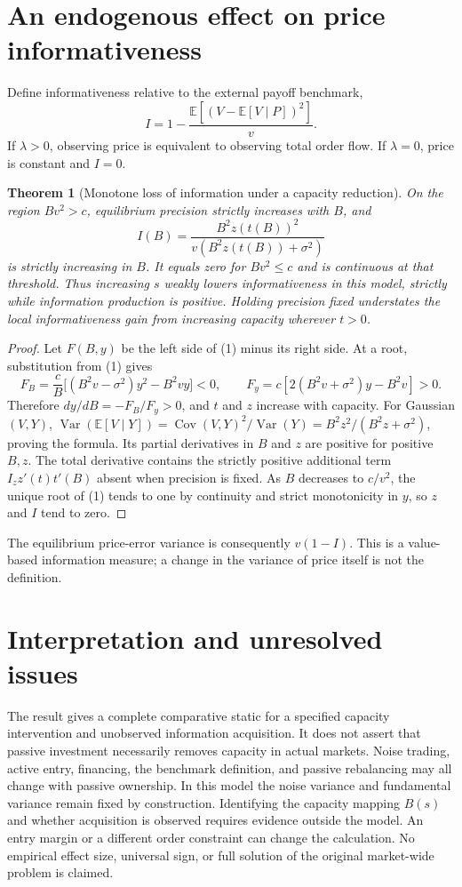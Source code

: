 \documentclass[11pt,a4paper]{article}
\newtheorem{theorem}{Theorem}[section]
\theoremstyle{remark}
\newcommand{\E}{\mathbb E}
\DeclareMathOperator{\Var}{Var}
\begin{document}
\section{An endogenous effect on price informativeness}
Define informativeness relative to the external payoff benchmark,
\[
 I=1-\frac{\E[(V-\E[V\mid P])^2]}{v}.
\]
If $\lambda>0$, observing price is equivalent to observing total order flow. If $\lambda=0$, price is constant and $I=0$.

\begin{theorem}[Monotone loss of information under a capacity reduction]
On the region $Bv^2>c$, equilibrium precision strictly increases with $B$, and
\[
 I(B)=\frac{B^2z(t(B))^2}{v(B^2z(t(B))+\sigma^2)}
\]
is strictly increasing in $B$. It equals zero for $Bv^2\le c$ and is continuous at that threshold. Thus increasing $s$ weakly lowers informativeness in this model, strictly while information production is positive. Holding precision fixed understates the local informativeness gain from increasing capacity wherever $t>0$.
\end{theorem}
\begin{proof}
Let $F(B,y)$ be the left side of (1) minus its right side. At a root, substitution from (1) gives
\[
 F_B=\frac cB\big[(B^2v-\sigma^2)y^2-B^2vy\big]<0,
 \qquad F_y=c[2(B^2v+\sigma^2)y-B^2v]>0.
\]
Therefore $dy/dB=-F_B/F_y>0$, and $t$ and $z$ increase with capacity. For Gaussian $(V,Y)$,
$\Var(\E[V\mid Y])=\operatorname{Cov}(V,Y)^2/\Var(Y)=B^2z^2/(B^2z+\sigma^2)$, proving the formula. Its partial derivatives in $B$ and $z$ are positive for positive $B,z$. The total derivative contains the strictly positive additional term $I_z z'(t)t'(B)$ absent when precision is fixed. As $B$ decreases to $c/v^2$, the unique root of (1) tends to one by continuity and strict monotonicity in $y$, so $z$ and $I$ tend to zero.
\end{proof}
The equilibrium price-error variance is consequently $v(1-I)$. This is a value-based information measure; a change in the variance of price itself is not the definition.

\section{Interpretation and unresolved issues}
The result gives a complete comparative static for a specified capacity intervention and unobserved information acquisition. It does not assert that passive investment necessarily removes capacity in actual markets. Noise trading, active entry, financing, the benchmark definition, and passive rebalancing may all change with passive ownership. In this model the noise variance and fundamental variance remain fixed by construction. Identifying the capacity mapping $B(s)$ and whether acquisition is observed requires evidence outside the model. An entry margin or a different order constraint can change the calculation. No empirical effect size, universal sign, or full solution of the original market-wide problem is claimed.
\end{document}
